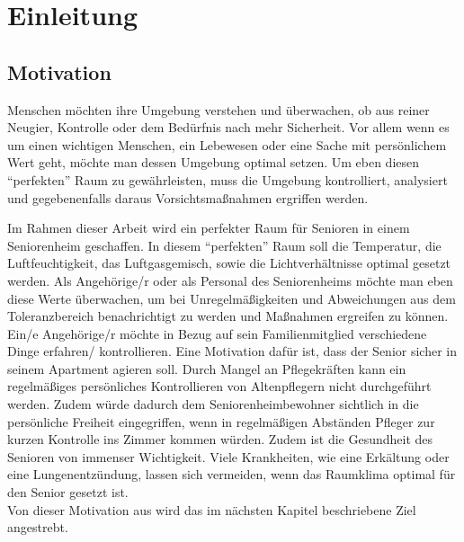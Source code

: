 \chapter{Einleitung}

\section{Motivation}
Menschen möchten ihre Umgebung verstehen und überwachen, ob aus reiner Neugier, Kontrolle oder dem Bedürfnis nach mehr Sicherheit. Vor allem wenn es um einen wichtigen Menschen, ein Lebewesen oder eine Sache mit persönlichem Wert geht, möchte man dessen Umgebung optimal setzen. Um eben diesen ``perfekten'' Raum zu gewährleisten, muss die Umgebung kontrolliert, analysiert und gegebenenfalls daraus Vorsichtsmaßnahmen ergriffen werden.

Im Rahmen dieser Arbeit wird ein perfekter Raum für Senioren in einem Seniorenheim geschaffen. In diesem ``perfekten'' Raum soll die Temperatur, die Luftfeuchtigkeit, das Luftgasgemisch, sowie die Lichtverhältnisse optimal gesetzt werden. Als Angehörige/r oder als Personal des Seniorenheims möchte man eben diese Werte überwachen, um bei Unregelmäßigkeiten und Abweichungen aus dem Toleranzbereich benachrichtigt zu werden und Maßnahmen ergreifen zu können.\\
Ein/e Angehörige/r möchte in Bezug auf sein Familienmitglied verschiedene Dinge erfahren/ kontrollieren. Eine Motivation dafür ist, dass der Senior sicher in seinem Apartment agieren soll. Durch Mangel an Pflegekräften kann ein regelmäßiges persönliches Kontrollieren von Altenpflegern nicht durchgeführt werden. Zudem würde dadurch dem Seniorenheimbewohner sichtlich in die persönliche Freiheit eingegriffen, wenn in regelmäßigen Abständen Pfleger zur kurzen Kontrolle ins Zimmer kommen würden. Zudem ist die Gesundheit des Senioren von immenser Wichtigkeit. Viele Krankheiten, wie eine Erkältung oder eine Lungenentzündung, lassen sich vermeiden, wenn das Raumklima optimal für den Senior gesetzt ist.\\
Von dieser Motivation aus wird das im nächsten Kapitel beschriebene Ziel angestrebt.
